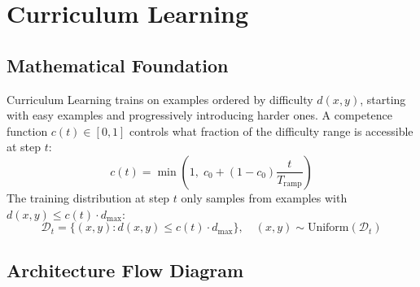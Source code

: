 \newpage
\section{Curriculum Learning}

\subsection{Mathematical Foundation}
Curriculum Learning trains on examples ordered by difficulty $d(x,y)$, starting with easy examples and progressively introducing harder ones. A competence function $c(t) \in [0,1]$ controls what fraction of the difficulty range is accessible at step $t$:
\begin{equation}
  c(t) = \min\!\left(1,\; c_0 + (1-c_0)\frac{t}{T_{\text{ramp}}}\right)
\end{equation}
The training distribution at step $t$ only samples from examples with $d(x,y) \leq c(t) \cdot d_{\max}$:
\begin{equation}
  \mathcal{D}_t = \{(x,y) : d(x,y) \leq c(t) \cdot d_{\max}\},\quad (x,y) \sim \text{Uniform}(\mathcal{D}_t)
\end{equation}

\subsection{Architecture Flow Diagram}

